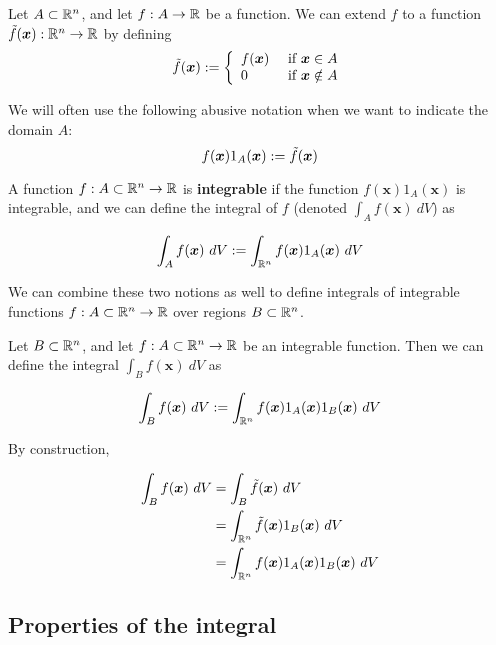 
    Let $A \subset \mathbb{R}^n$, and let $f : A \to \mathbb{R}$ be a function. We can extend $f$ to a function $\Tilde{f}(\bm{x}) : \mathbb{R}^n \to \mathbb{R}$ by defining
    $$\Tilde{f}(\bm{x}) := \left\{
		\begin{array}{ll}
			f(\bm{x}) & \text{ if } \bm{x} \in A \\
			0 & \text{ if } \bm{x} \notin A
		\end{array}
		\right.$$
        
    We will often use the following abusive notation when we want to indicate the domain $A$:
    $$f(\bm{x})1_A(\bm{x}) := \Tilde{f}(\bm{x})$$

    \begin{definition}
    A function $f: A \subset \mathbb{R}^n \to \mathbb{R}$ is \textbf{integrable} if the function $f(\bm{x})1_A(\bm{x})$ is integrable, and we can define the integral of $f$ (denoted $\int_A f(\bm{x}) \ dV$) as

    $$\int_A f(\bm{x}) \ dV := \int_{\mathbb{R}^n} f(\bm{x})1_A(\bm{x}) \ dV$$
    
    \end{definition}



    We can combine these two notions as well to define integrals of integrable functions $f : A \subset \mathbb{R}^n \to \mathbb{R}$ over regions $B \subset \mathbb{R}^n$.

    \begin{definition}
        Let $B \subset \mathbb{R}^n$, and let $f : A \subset \mathbb{R}^n \to \mathbb{R}$ be an integrable function. Then we can define the integral $\int_B f(\bm{x}) \ dV$ as

        $$\int_B f(\bm{x}) \ dV := \int_{\mathbb{R}^n} f(\bm{x})1_A(\bm{x})1_B(\bm{x}) \ dV$$
        
        By construction,

        \begin{align*}
        \int_B f(\bm{x}) \ dV &= \int_B \Tilde{f}(\bm{x}) \ dV \\
        &= \int_{\mathbb{R}^n} \Tilde{f}(\bm{x})1_B(\bm{x}) \ dV \\
        &= \int_{\mathbb{R}^n} f(\bm{x})1_A(\bm{x})1_B(\bm{x}) \ dV
    \end{align*}
    \end{definition}

\subsection{Properties of the integral}

